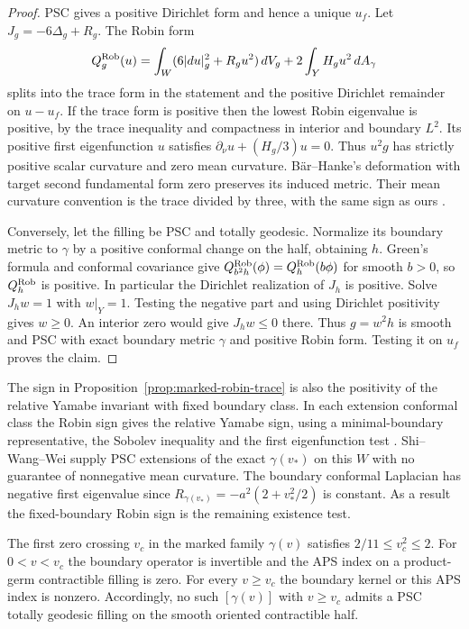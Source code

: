 \begin{proof}
PSC gives a positive Dirichlet form and hence a unique \(u_f\).
Let \(J_g=-6\Delta_g+R_g\). The Robin form
\[
 Q_g^{\rm Rob}(u)=\int_W(6|du|_g^2+R_gu^2)\,dV_g
                    +2\int_Y H_g u^2\,dA_\gamma
\]
splits into the trace form in the statement and the positive
Dirichlet remainder on \(u-u_f\). If the trace form is positive
then the lowest Robin eigenvalue is positive, by the trace
inequality and compactness in interior and boundary \(L^2\).
Its positive first eigenfunction \(u\) satisfies
\(\partial_\nu u+(H_g/3)u=0\). Thus \(u^2g\) has strictly
positive scalar curvature and zero mean curvature.
B\"ar--Hanke's deformation with target second fundamental
form zero preserves its induced metric. Their mean curvature
convention is the trace divided by three, with the same sign
as ours \cite[proof of Lemma 2.18 and Theorem 3.7]{BaerHanke2023Boundary}.

Conversely, let the filling be PSC and totally geodesic.
Normalize its boundary metric to \(\gamma\) by a positive
conformal change on the half, obtaining \(h\). Green's formula
and conformal covariance give
\(Q_{b^2h}^{\rm Rob}(\phi)=Q_h^{\rm Rob}(b\phi)\) for smooth
\(b>0\), so \(Q_h^{\rm Rob}\) is positive. In particular the
Dirichlet realization of \(J_h\) is positive. Solve
\(J_hw=1\) with \(w|_Y=1\). Testing the negative part and
using Dirichlet positivity gives \(w\ge0\). An interior zero
would give \(J_hw\le0\) there. Thus \(g=w^2h\) is smooth
and PSC with exact boundary metric \(\gamma\) and positive
Robin form. Testing it on \(u_f\) proves the claim.
\end{proof}

The sign in Proposition~\ref{prop:marked-robin-trace} is also
the positivity of the relative Yamabe invariant with fixed
boundary class. In each extension conformal class the Robin
sign gives the relative Yamabe sign, using a minimal-boundary
representative, the Sobolev inequality and the first eigenfunction
test \cite[\S\S1.1 and 1.3]{AkutagawaBotvinnik2002Relative}.
Shi--Wang--Wei \cite[Theorem 1.1 and Remark 2.1]{ShiWangWei2022FillIns}
supply PSC extensions of the exact
\(\gamma(v_*)\) on this \(W\) with no guarantee of nonnegative
mean curvature. The boundary conformal Laplacian has negative
first eigenvalue since \(R_{\gamma(v_*)}=-a^2(2+v_*^2/2)\) is
constant. As a result the fixed-boundary Robin sign is the
remaining existence test.

\begin{proposition}
\label{prop:homogeneous-spin-crossing}
The first zero crossing \(v_c\) in the marked family \(\gamma(v)\)
satisfies \(2/11\le v_c^2\le2\). For \(0<v<v_c\) the boundary
operator is invertible and the APS index on a product-germ
contractible filling is zero. For every \(v\ge v_c\) the boundary
kernel or this APS index is nonzero. Accordingly, no such
\([\gamma(v)]\) with \(v\ge v_c\) admits a PSC totally geodesic
filling on the smooth oriented contractible half.
\end{proposition}

